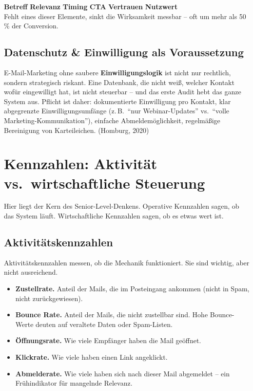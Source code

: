 \documentclass[11pt,a4paper,oneside]{article}
\newcommand{\fachbegriff}[1]{\textbf{#1}}
\newcommand{\quelle}[1]{{\footnotesize\color{lpGray}(#1)}}
\begin{document}
\begin{merkbox}
\textbf{Betreff} \textperiodcentered{} \textbf{Relevanz} \textperiodcentered{} \textbf{Timing} \textperiodcentered{} \textbf{CTA} \textperiodcentered{} \textbf{Vertrauen} \textperiodcentered{} \textbf{Nutzwert}\\[2pt]
Fehlt eines dieser Elemente, sinkt die Wirksamkeit messbar -- oft um mehr als 50\,\% der Conversion.
\end{merkbox}

\subsection{Datenschutz \& Einwilligung als Voraussetzung}

E-Mail-Marketing ohne saubere \fachbegriff{Einwilligungslogik} ist nicht nur rechtlich, sondern strategisch riskant. Eine Datenbank, die nicht weiß, welcher Kontakt wofür eingewilligt hat, ist nicht steuerbar -- und das erste Audit hebt das ganze System aus. Pflicht ist daher: dokumentierte Einwilligung pro Kontakt, klar abgegrenzte Einwilligungsumfänge (z.\,B.\ ``nur Webinar-Updates'' vs.\ ``volle Marketing-Kommunikation''), einfache Abmeldemöglichkeit, regelmäßige Bereinigung von Karteileichen. \quelle{Homburg, 2020}

\section{Kennzahlen: Aktivität vs.\ wirtschaftliche Steuerung}

Hier liegt der Kern des Senior-Level-Denkens. Operative Kennzahlen sagen, ob das System läuft. Wirtschaftliche Kennzahlen sagen, ob es etwas wert ist.

\subsection{Aktivitätskennzahlen}

Aktivitätskennzahlen messen, ob die Mechanik funktioniert. Sie sind wichtig, aber nicht ausreichend.

\begin{itemize}
  \item \fachbegriff{Zustellrate.} Anteil der Mails, die im Posteingang ankommen (nicht in Spam, nicht zurückgewiesen).
  \item \fachbegriff{Bounce Rate.} Anteil der Mails, die nicht zustellbar sind. Hohe Bounce-Werte deuten auf veraltete Daten oder Spam-Listen.
  \item \fachbegriff{Öffnungsrate.} Wie viele Empfänger haben die Mail geöffnet.
  \item \fachbegriff{Klickrate.} Wie viele haben einen Link angeklickt.
  \item \fachbegriff{Abmelderate.} Wie viele haben sich nach dieser Mail abgemeldet -- ein Frühindikator für mangelnde Relevanz.
\end{itemize}
\end{document}

